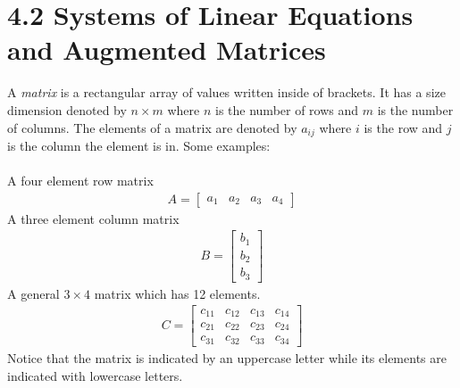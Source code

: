 \documentclass[14pt]{extarticle}
\begin{document}
\cleardoublepage

\section*{4.2 Systems of Linear Equations and Augmented Matrices}
A \textit{matrix } is a rectangular array of values written inside of brackets. It has a size dimension denoted by $n \times m$ where $n$ is the number of rows and $m$ is the number of columns. The elements of a matrix are denoted by $a_{ij}$ where $i$ is the row and $j$ is the column the element is in. Some examples:
\\\\
A four element row matrix
\begin{align*}
	A = \begin{bmatrix}
		a_1 & a_2 & a_3 & a_4
	\end{bmatrix}
\end{align*}
A three element column matrix
\begin{align*}
	B = \begin{bmatrix}
		b_1 \\
		b_2 \\
		b_3
	\end{bmatrix}
\end{align*}
A general $3 \times 4$ matrix which has 12 elements.
\begin{align*}
	C = \begin{bmatrix}
		c_{1 1} & c_{1 2} & c_{1 3} & c_{1 4} \\
		c_{2 1} & c_{2 2} & c_{2 3} & c_{2 4} \\
		c_{3 1} & c_{3 2} & c_{3 3} & c_{3 4}
	\end{bmatrix}
\end{align*}
Notice that the matrix is indicated by an uppercase letter while its elements are indicated with lowercase letters.
\end{document}
